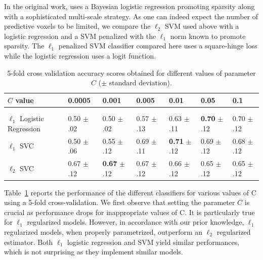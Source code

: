\documentclass{frontiersSCNS} %
\begin{document}
In the original work, \cite{miyawaki2008} uses a Bayesian logistic regression
promoting sparsity along with a sophisticated multi-scale strategy.
As one can indeed expect the number of predictive voxels to be limited, we 
compare the $\ell_2$ SVM used above with
a logistic regression and a SVM
penalized with the $\ell_1$ norm
known to promote sparsity. The $\ell_1$ penalized SVM classifier compared here
uses a square-hinge loss while the logistic regression uses a logit function.


\begin{table}[htbp]
    \begin{center}
    \begin{tabular}{l|llllll}
        $C$ value           & 0.0005 & 0.001  & 0.005  & 0.01   & 0.05    & 0.1    \\
    \hline\\[-.9em]
    \hline\\[-.7em]
        $\ell_1$ Logistic Regression & 0.50 $\pm$ .02
                                     & 0.50 $\pm$ .02 
                                     & 0.57 $\pm$ .13
                                     & 0.63 $\pm$ .11
                                     & \textbf{0.70} $\pm$ .12
                                     & 0.70 $\pm$ .12 \\[.1em]
        $\ell_1$ SVC        & 0.50 $\pm$ .06
                            & 0.55 $\pm$ .12
                            & 0.69 $\pm$ .11
                            & \textbf{0.71} $\pm$ .12
                            & 0.69 $\pm$ .12
                            & 0.68 $\pm$ .12 \\[.1em]
        $\ell_2$ SVC        & 0.67 $\pm$ .12
                            & \textbf{0.67} $\pm$ .12
                            & 0.67 $\pm$ .12
                            & 0.66 $\pm$ .12
                            & 0.65 $\pm$ .12
                            & 0.65 $\pm$ .12
    \end{tabular}
    \end{center}
    \caption{5-fold cross validation accuracy scores obtained for different
    values of parameter $C$ ($\pm$ standard deviation).}
    \label{fig:miyawaki_cv}
\end{table}

Table~\ref{fig:miyawaki_cv} reports the performance of the different classifiers
for various values of C using a 5-fold cross-validation.
We first observe that setting the parameter $C$ is
crucial as performance drops for inappropriate values of C. It is particularly
true for $\ell_1$ regularized models. However,
in accordance with our prior knowledge, $\ell_1$
regularized models, when properly
parametrized, outperform an $\ell_2$ regularized estimator.
Both $\ell_1$ logistic regression and SVM yield similar performances,
which is not surprising as they implement similar models.
\end{document}
